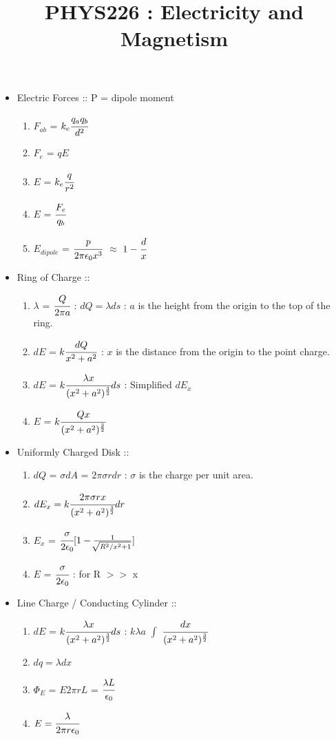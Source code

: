 \documentclass[12pt]{article}
\begin{document}
\title{PHYS226 : Electricity and Magnetism}
\maketitle


\begin{itemize}
	\item[] Electric Forces :: P = dipole moment
	\begin{enumerate}
		\item[] $F_{ab}$ = $k_e\cfrac{q_aq_b}{d^2}$
		\item[] $F_e$ = $qE$
		\item[] $E$ = $k_e\cfrac{q}{r^2}$
		\item[] $E$ = $\cfrac{F_e}{q_b}$
		\item[] $E_{dipole}$ = $\cfrac{p}{2\pi \epsilon_0 x^3}$ $\approx$ $1 - \cfrac{d}{x}$\\
	\end{enumerate}
	\item[] Ring of Charge ::
	\begin{enumerate}
		\item[] $\lambda$ = $\cfrac{Q}{2\pi a}$ : $dQ = \lambda ds$ : $a$ is the height from the origin to the top of the ring.
		\item[] $dE$ = $k \cfrac{dQ}{x^2 + a^2}$ : $x$ is the distance from the origin to the point charge.
		\item[] $dE$ = $k \cfrac{\lambda x}{(x^2 + a^2)^{\frac{3}{2}}}ds$ : Simplified $dE_x$
		\item[] $E$ = $k\cfrac{Qx}{(x^2 + a^2)^{\frac{3}{2}}}$ \\
	\end{enumerate}
	\item[] Uniformly Charged Disk ::
	\begin{enumerate}
		\item[] $dQ$ = $\sigma dA$ = $2\pi \sigma rdr$ : $\sigma$ is the charge per unit area.
		\item[] $dE_x = k\cfrac{2\pi \sigma rx}{(x^2 + a^2)^{\frac{3}{2}}}dr$
		\item[] $E_x$ = $\cfrac{\sigma}{2\epsilon_0}[1 - \frac{1}{\sqrt[]{R^2/x^2 + 1}}]$
		\item[] $E$ = $\cfrac{\sigma}{2\epsilon_0}$ : for R $>>$ x \\
	\end{enumerate}
		
	\item[] Line Charge / Conducting Cylinder ::
	\begin{enumerate}
		\item[] $dE$ = $k \cfrac{\lambda x}{(x^2 + a^2)^{\frac{3}{2}}}ds$ : $k\lambda a$ $\int$ $ \cfrac{dx}{(x^2 + a^2)^{\frac{3}{2}}}$
		\item[] $dq = \lambda dx$
		\item[] $\Phi_E$ = $E2\pi rL$ = $\cfrac{\lambda L}{\epsilon_0}$
		\item[] $E = \cfrac{\lambda}{2\pi r \epsilon_0}$
	\end{enumerate}
	

\end{itemize}
\end{document}
